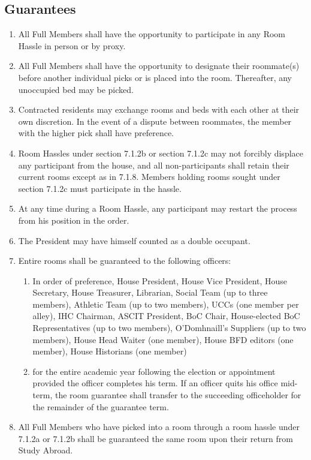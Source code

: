 \documentclass[10pt]{article} %
\begin{document}
\subsection{Guarantees}
\begin{enumerate}
\item All Full Members shall have the opportunity to participate in any Room Hassle in person or by proxy.
\item All Full Members shall have the opportunity to designate their roommate(s) before another individual picks or is placed into the room. Thereafter, any unoccupied bed may be picked.
\item Contracted residents may exchange rooms and beds with each other at their own discretion. In the event of a dispute between roommates, the member with the higher pick shall have preference.
\item Room Hassles under section 7.1.2b or section 7.1.2c may not forcibly displace any participant from the house, and all non-participants shall retain their current rooms except as in 7.1.8. Members holding rooms sought under section 7.1.2c must participate in the hassle.
\item At any time during a Room Hassle, any participant may restart the process from his position in the order.
\item The President may have himself counted as a double occupant.
\item Entire rooms shall be guaranteed to the following officers:
\begin{enumerate}
\item In order of preference, House President, House Vice President, House Secretary, House Treasurer, Librarian, Social Team (up to three members), Athletic Team (up to two members), UCCs (one member per alley), IHC Chairman, ASCIT President, BoC Chair, House-elected BoC Representatives (up to two members), O’Domhnaill’s Suppliers (up to two members), House Head Waiter (one member), House BFD editors (one member), House Historians (one member)
\item for the entire academic year following the election or appointment provided the officer completes his term. If an officer quits his office mid-term, the room guarantee shall transfer to the succeeding officeholder for the remainder of the guarantee term.
\end{enumerate}
\item All Full Members who have picked into a room through a room hassle under 7.1.2a or 7.1.2b shall be guaranteed the same room upon their return from Study Abroad.
\end{enumerate}
\end{document}
